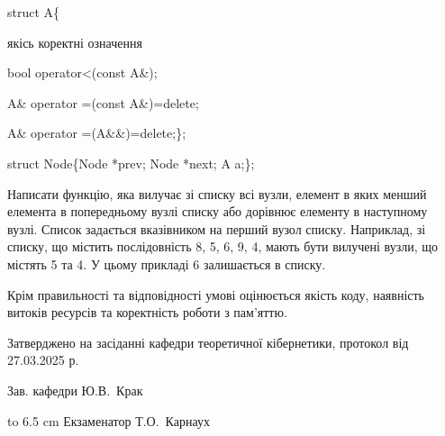 \documentclass[12pt, ukrainian]{article}
\begin{document}
{struct A\{

\quad  якісь коректні означення 

\quad  bool operator<(const A\&); 

\quad A\& operator =(const A\&)=delete; 

\quad  A\& operator =(A\&\&)=delete;\};

struct Node\{Node *prev; Node *next; A a;\};

Написати функцію, яка вилучає зі списку всі вузли, елемент в яких менший елемента в попередньому вузлі списку або дорівнює елементу в наступному вузлі. Список задається вказівником на перший вузол списку. Наприклад, зі списку, що містить послідовність 8, 5, 6, 9, 4, мають бути вилучені вузли, що містять 5 та 4. У цьому прикладі 6 залишається в списку.

Крім правильності та відповідності умові оцінюється якість коду, наявність витоків ресурсів та коректність роботи з пам'яттю. 

}
{\smallskip\smallskip \begin {scriptsize} Затверджено на засіданні кафедри теоретичної кібернетики, протокол   від   27.03.2025 р.\par\smallskip\smallskip\smallskip\smallskip
{\parbox {6.5 cm} {Зав. кафедри \dotfill Ю.В.~Крак}}\hspace {0.7cm} {\hbox to 6.5 cm { Екзаменатор \dotfill Т.О.~Карнаух}} \end{scriptsize}}
\newpage
\end{document}

